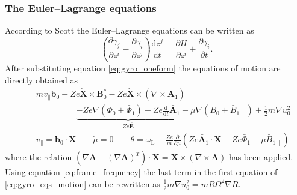 \documentclass[a4paper,10pt]{article}
\newcommand{\st}[1]{\mathrm{#1}} %
\begin{document}
\subsubsection{The Euler--Lagrange equations}
According to Scott \cite{scott_gotit} the Euler--Lagrange equations can be written as
\begin{equation}
	\left( \frac{\partial \gamma_j}{\partial z^i} - \frac{\partial \gamma_i}{\partial z^j} \right) \frac{\mathrm{d} z^j}{\mathrm{d} t} = \frac{\partial H}{\partial z^i} + \frac{\partial \gamma_i}{\partial t}.
	\label{eq:euler-lagrange}
\end{equation}
After substituting equation \ref{eq:gyro_oneform} the equations of motion are directly obtained as
\begin{eqnarray}
 	&& m \dot{v}_{\parallel} \mathbf{b}_0 - Z e \dot{\mathbf{X}} \times \mathbf{B}_0^{*} - Z e \dot{\mathbf{X}} \times \left( \nabla \times \bar{\mathbf{A}}_1 \right) =  \label{eq:gyro_eqs_motion} \\
	&& \hspace{2cm} \underbrace{- Z e \nabla \left( \Phi_0 + \bar{\Phi}_1 \right) - Z e \frac{\mathrm{d}}{\mathrm{d}t} \bar{\mathbf{A}}_1}_{Z e \bar{\mathbf{E}}} - \mu \nabla \left( B_0 + \bar{B}_{1 \parallel}\right) + \frac{1}{2}m \nabla u_0^2 \nonumber \\
	&& v_{\parallel} = \mathbf{b}_0 \cdot \dot{\mathbf{X}} \qquad \dot{\mu} = 0 \qquad \dot{\theta} = \omega_{\st{L}} - \frac{Z e}{m} \frac{\partial}{\partial \mu} \left( Z e \bar{\mathbf{A}}_1 \cdot \dot{\mathbf{X}} - Z e \bar{\Phi}_1 - \mu \bar{B}_{1 \parallel} \right) \nonumber
\end{eqnarray}
where the relation $\left(\nabla \mathbf{A} - (\nabla \mathbf{A})^T \right) \cdot \dot{\mathbf{X}} = \dot{\mathbf{X}} \times (\nabla \times \mathbf{A})$ has been applied. Using equation \ref{eq:frame_frequency} the last term in the first equation of \ref{eq:gyro_eqs_motion} can be rewritten as $\frac{1}{2}m \nabla u_0^2 = m R \Omega^2 \nabla R$. 
\end{document}
